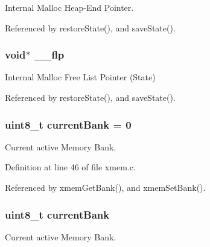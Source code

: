 Internal Malloc Heap-\/\-End Pointer. 



Referenced by restore\-State(), and save\-State().

\hypertarget{group__xmem_gadc2de04ee0c18717273d0ab52fd6dc1b}{
\subsubsection[{\-\_\-\-\_\-flp}]{\setlength{\rightskip}{0pt plus 5cm}void$\ast$ \-\_\-\-\_\-flp}}\label{group__xmem_gadc2de04ee0c18717273d0ab52fd6dc1b}


Internal Malloc Free List Pointer (State) 



Referenced by restore\-State(), and save\-State().

\hypertarget{group__xmem_ga4a1acf2db179d35f089bd00881d1c2eb}{
\subsubsection[{current\-Bank}]{\setlength{\rightskip}{0pt plus 5cm}uint8\-\_\-t current\-Bank = 0}}\label{group__xmem_ga4a1acf2db179d35f089bd00881d1c2eb}


Current active Memory Bank. 



Definition at line 46 of file xmem.\-c.



Referenced by xmem\-Get\-Bank(), and xmem\-Set\-Bank().

\hypertarget{group__xmem_ga4a1acf2db179d35f089bd00881d1c2eb}{
\subsubsection[{current\-Bank}]{\setlength{\rightskip}{0pt plus 5cm}uint8\-\_\-t current\-Bank}}\label{group__xmem_ga4a1acf2db179d35f089bd00881d1c2eb}


Current active Memory Bank. 



